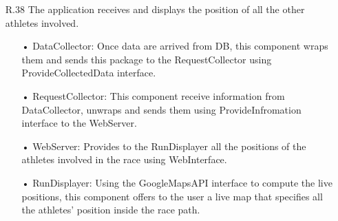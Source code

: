 \begin{enumerate}
\begin{enumerate}
\begin{enumerate}
		\end{enumerate}	
	\item [R.38] The application receives and displays the position of all the other athletes involved.
		\begin{enumerate}
		\item[•] DataCollector: Once data are arrived from DB, this component wraps them and sends this package to the RequestCollector using ProvideCollectedData interface.
		\item[•] RequestCollector: This component receive information from DataCollector, unwraps and sends them using ProvideInfromation interface to the WebServer.
		\item[•] WebServer: Provides to the RunDisplayer all the positions of the athletes involved in the race using WebInterface.
		\item[•] RunDisplayer: Using the GoogleMapsAPI interface to compute the live positions, this component offers to the user a live map that specifies all the athletes' position inside the race path.
		\end{enumerate}	
	\end{enumerate}
	
\end{enumerate} 